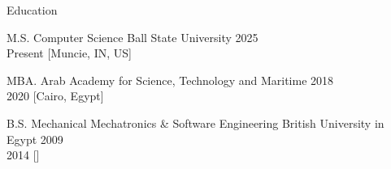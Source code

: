 \begin{rSection}{Education}
    \begin{rESubsection}
        {M.S. Computer Science}
        {Ball State University}
        {2025 \\ Present}
        [Muncie, IN, US] %
    \end{rESubsection}

    \begin{rESubsection}
        {MBA.}
        {Arab Academy for Science, Technology and Maritime}
        {2018 \\ 2020}
        [Cairo, Egypt] %
    \end{rESubsection}

    \begin{rESubsection}
        {B.S. Mechanical Mechatronics & Software Engineering}
        {British University in Egypt}
        {2009 \\ 2014}
        [] %
    \end{rESubsection}
\end{rSection}